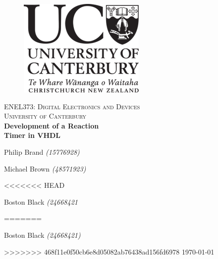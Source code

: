\documentclass[11pt]{article}
\begin{document}
\begin{titlepage}
    \begin{center}
      \begin{figure}
        \includegraphics[right]{logo.png}
      \end{figure}
      \vspace*{1cm}
      \textsc{\large ENEL373: Digital Electronics and Devices}\\[0.5cm]
      \textsc{\Large University of Canterbury}\\[3.5cm]
      \linespread{1}
      {\Huge\bfseries{Development of a Reaction \\[0.3cm] Timer in VHDL}} \\
      \vspace*{2cm}
      {\Huge Philip Brand \textit{\Large(15776928)}\\\par}
      {\Huge Michael Brown \textit{\Large(48571923)}\\\par}
<<<<<<< HEAD
      {\Huge Boston Black \textit{\Large(24668421}\\\par}
=======
      {\Huge Boston Black \textit{\Large(24668421)}\\\par}
>>>>>>> 468f11e0f50cb6e8d05082ab76438ad156fd6978
      \vspace*{3cm}
      {\LARGE \today}
    \end{center}
  \end{titlepage}
\restoregeometry

\fancyhead{}
\fancyhead[R]{\small{\today}}


\renewcommand{\baselinestretch}{1.3}\normalsize
\setlength{\cftbeforesecskip}{0.3em}
\renewcommand{\cftsecleader}{\cftdotfill{\cftdotsep}}
\tableofcontents\thispagestyle{fancy}
\renewcommand{\baselinestretch}{1}\normalsize
\end{document}
